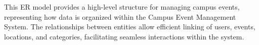 This ER model provides a high-level structure for managing campus events, representing how data is organized within the Campus Event Management System. The relationships between entities allow efficient linking of users, events, locations, and categories, facilitating seamless interactions within the system.
\clearpage